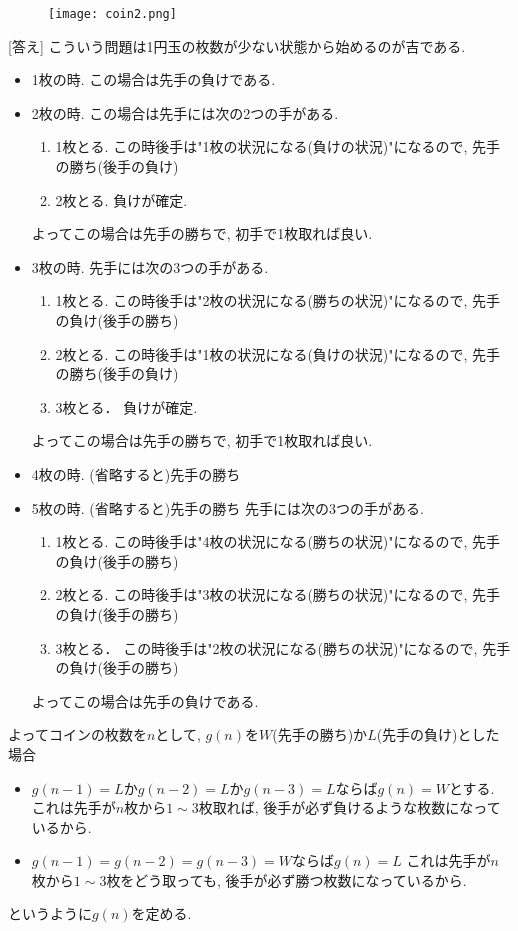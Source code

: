 \documentclass[dvipdfmx,a4paper,12pt]{article} %
\theoremstyle{definition}
\theoremstyle{remark}
\numberwithin{equation}{section}
\begin{document}
\begin{figure}[htbp]
\begin{center}
\texttt{[image: coin2.png]}
\end{center}
\end{figure}

[答え]
こういう問題は1円玉の枚数が少ない状態から始めるのが吉である.
\begin{itemize}
\item 1枚の時. この場合は先手の負けである.
\item 2枚の時. この場合は先手には次の2つの手がある. 
\begin{enumerate}
\item 1枚とる. この時後手は"1枚の状況になる(負けの状況)"になるので, 先手の勝ち(後手の負け)
\item 2枚とる. 負けが確定.
\end{enumerate}
よってこの場合は先手の勝ちで, 初手で1枚取れば良い.
\item 3枚の時. 先手には次の3つの手がある.
\begin{enumerate}
\item 1枚とる. この時後手は"2枚の状況になる(勝ちの状況)"になるので, 先手の負け(後手の勝ち)
\item 2枚とる. この時後手は"1枚の状況になる(負けの状況)"になるので, 先手の勝ち(後手の負け)
\item 3枚とる． 負けが確定.
\end{enumerate}
よってこの場合は先手の勝ちで, 初手で1枚取れば良い.
\item  4枚の時. (省略すると)先手の勝ち
\item  5枚の時. (省略すると)先手の勝ち 先手には次の3つの手がある.
\begin{enumerate}
\item 1枚とる. この時後手は"4枚の状況になる(勝ちの状況)"になるので, 先手の負け(後手の勝ち)
\item 2枚とる.  この時後手は"3枚の状況になる(勝ちの状況)"になるので, 先手の負け(後手の勝ち)
\item 3枚とる．  この時後手は"2枚の状況になる(勝ちの状況)"になるので, 先手の負け(後手の勝ち)
\end{enumerate}
よってこの場合は先手の負けである.
\end{itemize}

よってコインの枚数を$n$として, $g(n)$を$W$(先手の勝ち)か$L$(先手の負け)とした場合
\begin{itemize}
\item $g(n-1)=L$か$g(n-2)=L$か$g(n-3)=L$ならば$g(n)=W$とする. 
これは先手が$n$枚から$1\sim3$枚取れば, 後手が必ず負けるような枚数になっているから.
\item $g(n-1)=g(n-2)=g(n-3)=W$ならば$g(n)=L$
これは先手が$n$枚から$1\sim3$枚をどう取っても, 後手が必ず勝つ枚数になっているから.
\end{itemize}
というように$g(n)$を定める.
\end{document}
